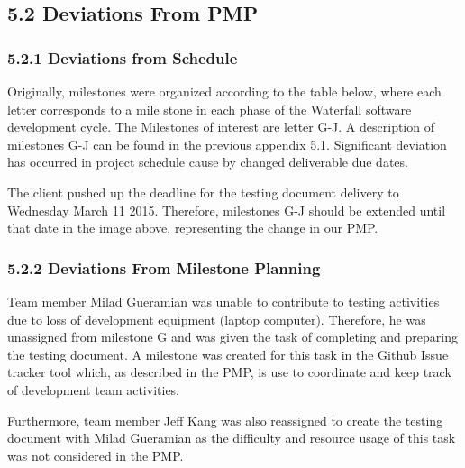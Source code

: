 \documentclass[]{article}
\begin{document}
\subsection{\textbf{5.2 Deviations From PMP}}\label{deviations-from-pmp}

\subsubsection{\textbf{5.2.1 Deviations from
Schedule}}\label{deviations-from-schedule}

Originally, milestones were organized according to the table below,
where each letter corresponds to a mile stone in each phase of the
Waterfall software development cycle. The Milestones of interest are
letter G-J. A description of milestones G-J can be found in the previous
appendix 5.1. Significant deviation has occurred in project schedule
cause by changed deliverable due dates.

The client pushed up the deadline for the testing document delivery to
Wednesday March 11 2015. Therefore, milestones G-J should be extended
until that date in the image above, representing the change in our PMP.

\subsubsection{\textbf{5.2.2 Deviations From Milestone
Planning}}\label{deviations-from-milestone-planning}

Team member Milad Gueramian was unable to contribute to testing
activities due to loss of development equipment (laptop computer).
Therefore, he was unassigned from milestone G and was given the task of
completing and preparing the testing document. A milestone was created
for this task in the Github Issue tracker tool which, as described in
the PMP, is use to coordinate and keep track of development team
activities.

Furthermore, team member Jeff Kang was also reassigned to create the
testing document with Milad Gueramian as the difficulty and resource
usage of this task was not considered in the PMP.
\end{document}
